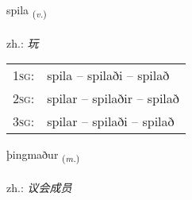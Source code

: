 \documentclass[frontgrid, backgrid]{flacards}\usepackage[]{graphicx}\usepackage[]{xcolor}
\begin{document}
\renewcommand{\flhead}{\vskip5pt \fboxsep=0pt {\small\bfseries\footnotesize Sagnorð | 动词}}
\renewcommand{\fcfoot}{\vskip5pt \fboxsep=0pt \hspace{2pt}{\small\bfseries\footnotesize 1K}}

\renewcommand{\blhead}{\vskip5pt {\small\bfseries\footnotesize Sagnorð | 动词 }}
\renewcommand{\bcfoot}{\vskip5pt \hspace{2pt}{\small\bfseries\footnotesize 1K}}


{spila \small{\textsubscript{(\textit{v.})}} \\[1ex] %
\textphonetic{[spɪːla]} \\
zh.: \emph{玩} \\  [2ex]
\renewcommand*{\arraystretch}{0.8}
\begin{tabular}{p{1cm}l}
\textsc{1sg}: & spila -- spilaði -- spilað \\ 
\textsc{2sg}: & spilar -- spilaðir -- spilað \\ 
\textsc{3sg}: & spilar -- spilaði -- spilað \\ 
\end{tabular}
}

\renewcommand{\flhead}{\vskip5pt \fboxsep=0pt {\small\bfseries\footnotesize Nafnorð | 名词}}
\renewcommand{\fcfoot}{\vskip5pt \fboxsep=0pt \hspace{2pt}{\small\bfseries\footnotesize 1K}}

\renewcommand{\blhead}{\vskip5pt {\small\bfseries\footnotesize Nafnorð | 名词 }}
\renewcommand{\bcfoot}{\vskip5pt \hspace{2pt}{\small\bfseries\footnotesize 1K}}


{þingmaður \small{\textsubscript{(\textit{m.})}} \\[1ex] %
\textphonetic{[θiŋkmaðʏr]} \\
zh.: \emph{议会成员} \\  [2ex]
\renewcommand*{\arraystretch}{0.8}
}
\end{document}
